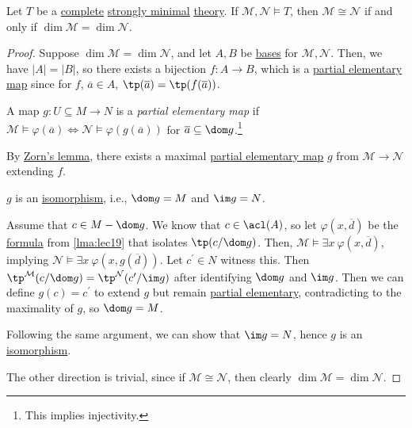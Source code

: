 \begin{theorem}
	Let \(T\) be a \hyperref[def:theory-complete]{complete} \hyperref[def:strongly-minimal]{strongly minimal} \hyperref[def:theory]{theory}. If \(\mathcal{M} , \mathcal{N} \models T\), then \(\mathcal{M} \cong \mathcal{N} \) if and only if \(\dim \mathcal{M} = \dim \mathcal{N} \).
\end{theorem}
\begin{proof}
	Suppose \(\dim \mathcal{M} = \dim \mathcal{N} \), and let \(A, B\) be \hyperref[def:basis]{bases} for \(\mathcal{M} , \mathcal{N} \). Then, we have \(\vert A \vert = \vert B \vert \), so there exists a bijection \(f\colon A \to B\), which is a \hyperref[not:partial-elementary-map]{partial elementary map} since for \(f\), \(\overline{a} \in A\), \(\tp(\overline{a} ) = \tp(f(\overline{a} ))\).

	\begin{notation}\label{not:partial-elementary-map}
		A map \(g \colon U \subseteq M \to N\) is a \emph{partial elementary map} if \(\mathcal{M} \models \varphi (\overline{a} ) \iff \mathcal{N} \models \varphi (g(\overline{a} ))\) for \(\overline{a} \subseteq \dom g\).\footnote{This implies injectivity.}
	\end{notation}

	By \hyperref[thm:Zorn]{Zorn's lemma}, there exists a maximal \hyperref[not:partial-elementary-map]{partial elementary map} \(g\) from \(\mathcal{M} \to  \mathcal{N} \) extending \(f\).

	\begin{claim}
		\(g\) is an \hyperref[def:isomorphism]{isomorphism}, i.e., \(\dom g = M \) and \(\im g = N\).
	\end{claim}
	\begin{explanation}
		Assume that \(c \in M - \dom g\). We know that \(c\in \acl(A)\), so let \(\varphi (x, \overline{d} )\) be the \hyperref[def:formula]{formula} from \autoref{lma:lec19} that isolates \(\tp(c / \dom g)\). Then, \(\mathcal{M} \models \exists x\ \varphi (x, \overline{d} )\), implying \(\mathcal{N} \models \exists x\ \varphi (x, g(\overline{d} ))\). Let \(c^{\prime} \in N\) witness this. Then \(\tp^{\mathcal{M} } (c / \dom g) = \tp^{\mathcal{N} } (c^{\prime} / \im g)\) after identifying \(\dom g\) and \(\im g\). Then we can define \(g(c) = c^{\prime} \) to extend \(g\) but remain \hyperref[not:partial-elementary-map]{partial elementary}, contradicting to the maximality of \(g\), so \(\dom g = M\).

		Following the same argument, we can show that \(\im g = N\), hence \(g\) is an \hyperref[def:isomorphism]{isomorphism}.
	\end{explanation}
	The other direction is trivial, since if \(\mathcal{M} \cong \mathcal{N} \), then clearly \(\dim \mathcal{M} = \dim \mathcal{N} \).
\end{proof}
